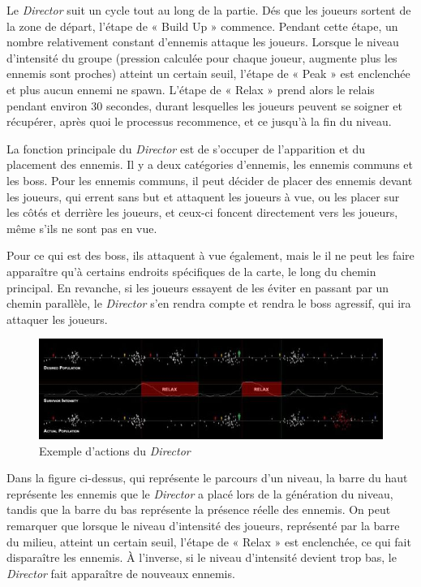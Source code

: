 \documentclass[a4paper, 12pt]{article} %
\begin{document}
Le \textit{Director} suit un cycle tout au long de la partie. Dés que les joueurs sortent de la zone de départ, l’étape de « Build Up » commence. Pendant cette étape, un nombre relativement constant d'ennemis attaque les joueurs. Lorsque le niveau d’intensité du groupe (pression calculée pour chaque joueur, augmente plus les ennemis sont proches) atteint un certain seuil, l’étape de « Peak » est enclenchée et plus aucun ennemi ne spawn. L’étape de « Relax » prend alors le relais pendant environ 30 secondes, durant lesquelles les joueurs peuvent se soigner et récupérer, après quoi le processus recommence, et ce jusqu’à la fin du niveau.

La fonction principale du \textit{Director} est de s’occuper de l’apparition et du placement des ennemis. Il y a deux catégories d’ennemis, les ennemis communs et les boss. Pour les ennemis communs, il peut décider de placer des ennemis devant les joueurs, qui errent sans but et attaquent les joueurs à vue, ou les placer sur les côtés et derrière les joueurs, et ceux-ci foncent directement vers les joueurs, même s’ils ne sont pas en vue.

Pour ce qui est des boss, ils attaquent à vue également, mais le il ne peut les faire apparaître qu’à certains endroits spécifiques de la carte, le long du chemin principal. En revanche, si les joueurs essayent de les éviter en passant par un chemin parallèle, le \textit{Director} s’en rendra compte et rendra le boss agressif, qui ira attaquer les joueurs.

\begin{figure}[!h]%
	\begin{center} 
		\includegraphics[width=1.0\columnwidth]{images/aiDirector.jpg}%
		\caption{Exemple d'actions du \textit{Director}}%
	\end{center}
\end{figure}

Dans la figure ci-dessus, qui représente le parcours d'un niveau, la barre du haut représente les ennemis que le \textit{Director} a placé lors de la génération du niveau, tandis que la barre du bas représente la présence réelle des ennemis. On peut remarquer que lorsque le niveau d'intensité des joueurs, représenté par la barre du milieu, atteint un certain seuil, l'étape de « Relax » est enclenchée, ce qui fait disparaître les ennemis. À l'inverse, si le niveau d'intensité devient trop bas, le \textit{Director} fait apparaître de nouveaux ennemis.
\end{document}
